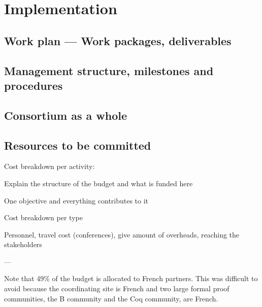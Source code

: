 \chapter{Implementation}\label{chap:implementation}

\section{Work plan --- Work packages, deliverables}



\section{Management structure, milestones and procedures}



\section{Consortium as a whole}\label{sec:consortium}



\section{Resources to be committed}\label{sec:resources}

\wpfigstyle{\scriptsize\setlength{\tabcolsep}{2pt}}
\wpfig%


{\color{red}

Cost breakdown per activity:

Explain the structure of the budget and what is funded here

One objective and everything contributes to it

Cost breakdown per type

Personnel, travel cost (conferences), give amount of overheads,
reaching the stakeholders}

---



Note that 49\% of the budget is allocated to French partners.
This was difficult to
avoid because the coordinating site is French and two large formal proof
communities, the B community and the Coq community, are French.

